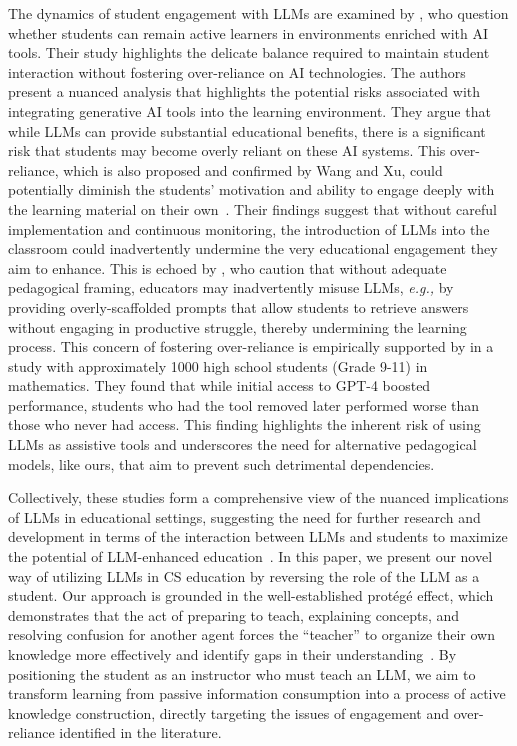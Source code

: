 \documentclass{article} %
\begin{document}
The dynamics of student engagement with LLMs are examined by \cite{lee2022generative}, who question whether students can remain active
learners in environments enriched with AI tools. Their study highlights the
delicate balance required to maintain student interaction without fostering
over-reliance on AI technologies. The authors present a nuanced analysis that
highlights the potential risks associated with integrating generative AI tools
into the learning environment. They argue that while LLMs can provide
substantial educational benefits, there is a significant risk that students may
become overly reliant on these AI systems. This over-reliance, which is also proposed and confirmed by Wang and Xu, could potentially diminish the students' motivation and ability to engage deeply with the learning material on their own~\citep{wang2024large}. Their findings suggest that without careful implementation and
continuous monitoring, the introduction of LLMs into the classroom could
inadvertently undermine the very educational engagement they aim to enhance. This is echoed by \cite{jeon_large_2023}, who caution that without adequate pedagogical framing, educators may inadvertently misuse LLMs, {\em e.g.,} by providing overly-scaffolded prompts that allow students to retrieve answers without engaging in productive struggle, thereby undermining the learning process.
This concern of fostering over-reliance is empirically supported by \cite{bastani2024generative} in a study with approximately 1000 high school students (Grade 9-11) in mathematics. They found that while initial access to GPT-4 boosted performance, students who had the tool removed later performed worse than those who never had access. This finding highlights the inherent risk of using LLMs as assistive tools and underscores the need for alternative pedagogical models, like ours, that aim to prevent such detrimental dependencies.


Collectively, these studies form a comprehensive view of the nuanced
implications of LLMs in educational settings, suggesting the need for further
research and development in terms of the interaction between LLMs and students
to maximize the potential of LLM-enhanced education~\citep{markel_gpteach_2023}. In this paper, we present
our novel way of utilizing LLMs in CS education by reversing the
role of the LLM as a student.
Our approach is grounded in the well-established prot\'eg\'e effect, which demonstrates that the act of preparing to teach, explaining concepts, and resolving confusion for another agent forces the ``teacher'' to organize their own knowledge more effectively and identify gaps in their understanding~\citep{chase2009teachable, roscoe2007understanding}. By positioning the student as an instructor who must teach an LLM, we aim to transform learning from passive information consumption into a process of active knowledge construction, directly targeting the issues of engagement and over-reliance identified in the literature.
\end{document}
